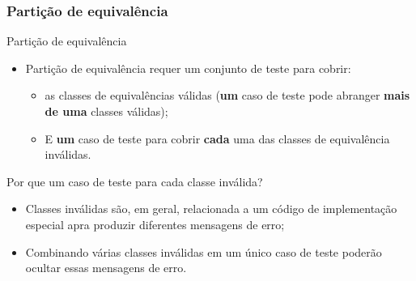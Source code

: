 \begin{frame}[hasnext=true, hasprev=true]
\frametitle{Partição de equivalência}

\begin{block:fact}{Partição de equivalência}
\begin{itemize}
	\item Partição de equivalência requer um conjunto de teste para cobrir:
	\begin{itemize}
		\item as classes de equivalências válidas (\textbf{um} caso de teste pode abranger
		\textbf{mais de uma} classes válidas);

		\item E \textbf{um} caso de teste para cobrir \textbf{cada} uma das
		classes de equivalência inválidas.
	\end{itemize}
\end{itemize}
\end{block:fact}

\begin{block:fact}{Por que um caso de teste para cada classe inválida?}
\begin{itemize}
	\item Classes inválidas são, em geral, relacionada a um código de implementação
	especial apra produzir diferentes mensagens de erro;

	\item Combinando várias classes inválidas em um único caso de teste poderão
	ocultar essas mensagens de erro.
\end{itemize}
\end{block:fact}
\end{frame}


